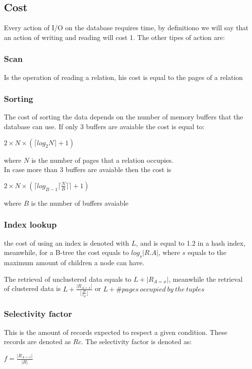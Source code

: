 \documentclass[12pt, a4paper]{article}
\begin{document}
\subsection{Cost}
Every action of I/O on the database requires time, by definitiono we will say that an action of writing and reading will cost 1.
The other tipes of action are:

\subsubsection*{Scan}
Is the operation of reading a relation, his cost is equal to the pages of a relation

\subsubsection*{Sorting}
The cost of sorting the data depends on the number of memory buffers that the database can use. If only 3 buffers are avaiable 
the cost is equal to:
\begin{center}
    $2\times N\times (\lceil log_{2}N\rceil+1)$
\end{center}
where $N$ is the number of pages that a relation occupies.\\In case more than 3 buffers are avaiable then the cost is
\begin{center}
    $2\times N\times (\lceil log_{B-1}\lceil\frac{N}{B}\rceil\rceil+1)$
\end{center}
where $B$ is the number of buffers avaiable

\subsubsection*{Index lookup}
the cost of using an index is denoted with $L$, and is equal to 1.2 in a hash index, meanwhile, for a B-tree the cost equals 
to $log_{s}|R.A|$, where $s$ equals to the maximum amount of children a node can have.

The retrieval of unclustered data equals to $L + |R_{A=x}|$, meanwhile the retrieval of clustered data is 
$L + \frac{|R_{A=x}|}{\lfloor\frac{P}{t_{R}}\rfloor}$ or $L + \# pages\ occupied\ by\ the\ tuples$

\subsubsection*{Selectivity factor}
This is the amount of records expected to respect a given condition. These records are denoted as $Rc$. The selectivity
factor is denoted as:
\begin{center}
    $f = \frac{|R_{A=x}|}{|R|}$ 
\end{center}
\end{document}
